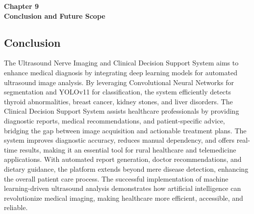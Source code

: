 \documentclass[12pt]{article}
\begin{document}
\setcounter{page}{60}


\vspace*{\fill}

\begin{center}
    {\Large \bf Chapter 9} \\[1em] %
    {\Large \bf Conclusion and Future Scope}
\end{center}
\vspace*{\fill}

\newpage

\setcounter{section}{9}


\subsection{Conclusion}

The Ultrasound Nerve Imaging and Clinical Decision Support System aims to enhance medical
diagnosis by integrating deep learning models for automated ultrasound image analysis. By leveraging Convolutional Neural Networks for segmentation and YOLOv11 for classification, the system efficiently detects thyroid abnormalities, breast cancer, kidney stones, and liver disorders. The
Clinical Decision Support System assists healthcare professionals by providing diagnostic reports,
medical recommendations, and patient-specific advice, bridging the gap between image acquisition
and actionable treatment plans. The system improves diagnostic accuracy, reduces manual dependency, and offers real-time results, making it an essential tool for rural healthcare and telemedicine
applications. With automated report generation, doctor recommendations, and dietary guidance,
the platform extends beyond mere disease detection, enhancing the overall patient care process.
The successful implementation of machine learning-driven ultrasound analysis demonstrates how
artificial intelligence can revolutionize medical imaging, making healthcare more efficient, accessible, and reliable.


\vspace{10pt}
\end{document}
